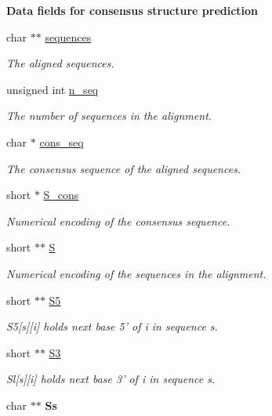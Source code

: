 \begin{Indent}{\bf Data fields for consensus structure prediction}\par
\begin{DoxyCompactItemize}
\item 
char $\ast$$\ast$ \hyperlink{group__fold__compound_a965dbb42f2e13cace5aa3bbab4396530}{sequences}
\begin{DoxyCompactList}\small\item\em The aligned sequences. \end{DoxyCompactList}\item 
unsigned int \hyperlink{group__fold__compound_a614702ab74478e786272be44f8cebfe3}{n\-\_\-seq}
\begin{DoxyCompactList}\small\item\em The number of sequences in the alignment. \end{DoxyCompactList}\item 
char $\ast$ \hyperlink{group__fold__compound_ac472afde64d8b3c8b84e4809fda7d814}{cons\-\_\-seq}
\begin{DoxyCompactList}\small\item\em The consensus sequence of the aligned sequences. \end{DoxyCompactList}\item 
short $\ast$ \hyperlink{group__fold__compound_aa3fab7ae38ebfed2028375221d295686}{S\-\_\-cons}
\begin{DoxyCompactList}\small\item\em Numerical encoding of the consensus sequence. \end{DoxyCompactList}\item 
short $\ast$$\ast$ \hyperlink{group__fold__compound_aebb37297f92c7bd22aac6343f8f61d61}{S}
\begin{DoxyCompactList}\small\item\em Numerical encoding of the sequences in the alignment. \end{DoxyCompactList}\item 
short $\ast$$\ast$ \hyperlink{group__fold__compound_a78d089b475e2230bd536b9a6ed8bb17c}{S5}
\begin{DoxyCompactList}\small\item\em S5\mbox{[}s\mbox{]}\mbox{[}i\mbox{]} holds next base 5' of i in sequence s. \end{DoxyCompactList}\item 
short $\ast$$\ast$ \hyperlink{group__fold__compound_af6ab2a25b84d2308ee23f6b11b5fd52d}{S3}
\begin{DoxyCompactList}\small\item\em Sl\mbox{[}s\mbox{]}\mbox{[}i\mbox{]} holds next base 3' of i in sequence s. \end{DoxyCompactList}\item 
\hypertarget{group__fold__compound_abf4a526147da57db63990892987fea29}{char $\ast$$\ast$ {\bfseries Ss}}\label{group__fold__compound_abf4a526147da57db63990892987fea29}


\end{DoxyCompactItemize}
\end{Indent}
